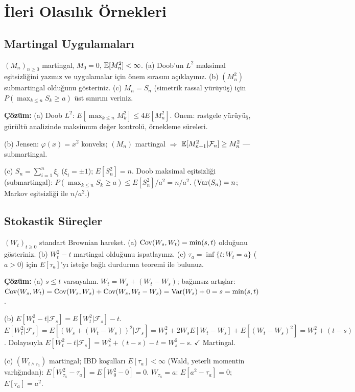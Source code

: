 \section{İleri Olasılık Örnekleri}
\label{app:ileri_olasilik}

\subsection{Martingal Uygulamaları}

\begin{ornek}
$(M_n)_{n\geq0}$ martingal, $M_0=0$, $\mathbb{E}[M_n^2]<\infty$.
(a) Doob'un $L^2$ maksimal eşitsizliğini yazınız ve uygulamalar için önem sırasını açıklayınız.
(b) $(M_n^2)$ submartingal olduğunu gösteriniz.
(c) $M_n=S_n$ (simetrik rassal yürüyüş) için $P(\max_{k\leq n}S_k\geq a)$ üst sınırını veriniz.

\textbf{Çözüm:}
(a) Doob $L^2$: $E[\max_{k\leq n}M_k^2]\leq 4E[M_n^2]$. Önem: rastgele yürüyüş, gürültü analizinde maksimum değer kontrolü, örnekleme süreleri.

(b) Jensen: $\varphi(x)=x^2$ konveks; $(M_n)$ martingal $\Rightarrow$ $\mathbb{E}[M_{n+1}^2|\mathcal{F}_n]\geq M_n^2$ --- submartingal.

(c) $S_n=\sum_{i=1}^n\xi_i$ ($\xi_i=\pm1$); $E[S_n^2]=n$.
Doob maksimal eşitsizliği (submartingal): $P(\max_{k\leq n}S_k\geq a)\leq E[S_n^2]/a^2=n/a^2$.
($\operatorname{Var}(S_n)=n$; Markov eşitsizliği ile $n/a^2$.)
\end{ornek}

\subsection{Stokastik Süreçler}

\begin{ornek}
$(W_t)_{t\geq0}$ standart Brownian hareket.
(a) $\operatorname{Cov}(W_s,W_t)=\min(s,t)$ olduğunu gösteriniz.
(b) $W_t^2-t$ martingal olduğunu ispatlayınız.
(c) $\tau_a=\inf\{t:W_t=a\}$ ($a>0$) için $E[\tau_a]$'yı isteğe bağlı durdurma teoremi ile bulunuz.

\textbf{Çözüm:}
(a) $s\leq t$ varsayalım. $W_t=W_s+(W_t-W_s)$; bağımsız artışlar:
$\operatorname{Cov}(W_s,W_t)=\operatorname{Cov}(W_s,W_s)+\operatorname{Cov}(W_s,W_t-W_s)=\operatorname{Var}(W_s)+0=s=\min(s,t)$.

(b) $E[W_t^2-t|\mathcal{F}_s]=E[W_t^2|\mathcal{F}_s]-t$.
$E[W_t^2|\mathcal{F}_s]=E[(W_s+(W_t-W_s))^2|\mathcal{F}_s]=W_s^2+2W_sE[W_t-W_s]+E[(W_t-W_s)^2]=W_s^2+(t-s)$.
Dolayısıyla $E[W_t^2-t|\mathcal{F}_s]=W_s^2+(t-s)-t=W_s^2-s$. $\checkmark$ Martingal.

(c) $(W_{t\wedge\tau_a})$ martingal; IBD koşulları $E[\tau_a]<\infty$ (Wald, yeterli momentin varlığından):
$E[W_{\tau_a}^2-\tau_a]=E[W_0^2-0]=0$. $W_{\tau_a}=a$: $E[a^2-\tau_a]=0$; $E[\tau_a]=a^2$.
\end{ornek}


